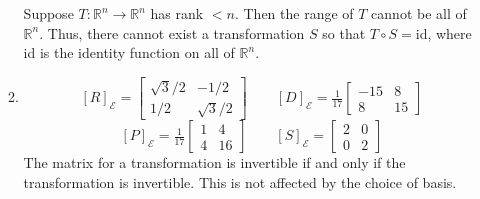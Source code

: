 \documentclass[red]{tutorial}
\newcommand{\R}{\mathbb{R}}
\newcommand{\mat}[1]{\begin{bmatrix}#1\end{bmatrix}}
\theoremstyle{definition}
\theoremstyle{theorem}
\begin{document}
\begin{solutions}
\begin{enumerate}
\begin{enumerate}
					Suppose $T:\R^n\to\R^n$ has rank $< n$. Then the range of $T$ cannot
					be all of $\R^n$. Thus, there cannot exist a transformation $S$ so that
					$T\circ S=$id, where id is the identity function on all of $\R^n$.
				\item 
					\[
						[R]_{\mathcal E} = \mat{\sqrt{3}/2&-1/2\\1/2&\sqrt{3}/2}\qquad
						[D]_{\mathcal E} = \tfrac{1}{17}\mat{-15&8\\8&15}
						\]\[
						[P]_{\mathcal E} = \tfrac{1}{17}\mat{1&4\\4&16}\qquad
						[S]_{\mathcal E} = \mat{2&0\\0&2}
					\]
					The matrix for a transformation is invertible if and only if the
					transformation is invertible. This is not affected by the choice of basis.
			\end{enumerate}
		\end{enumerate}
	\end{solutions}
\end{document}
